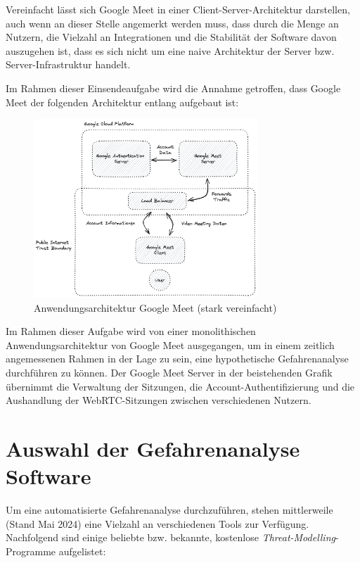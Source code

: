 \documentclass{article}
\begin{document}
Vereinfacht lässt sich Google Meet in einer Client-Server-Architektur darstellen, auch 
wenn an dieser Stelle angemerkt werden muss, dass durch die Menge an Nutzern, die Vielzahl 
an Integrationen und die Stabilität der Software davon auszugehen ist, dass es sich nicht 
um eine naive Architektur der Server bzw. Server-Infrastruktur handelt. 

Im Rahmen dieser Einsendeaufgabe wird die Annahme getroffen, dass Google Meet der 
folgenden Architektur entlang aufgebaut ist:

\begin{figure}[H]
	\includegraphics[width=0.75\textwidth]{./google-meet-diagram.png}
	\centering
	\caption{Anwendungsarchitektur Google Meet (stark vereinfacht)}
\end{figure}

Im Rahmen dieser Aufgabe wird von einer monolithischen Anwendungsarchitektur von Google 
Meet ausgegangen, um in einem zeitlich angemessenen Rahmen in der Lage zu sein, eine 
hypothetische Gefahrenanalyse durchführen zu können. Der Google Meet Server in der 
beistehenden Grafik übernimmt die Verwaltung der Sitzungen, die Account-Authentifizierung 
und die Aushandlung der WebRTC-Sitzungen zwischen verschiedenen Nutzern.

\section{Auswahl der Gefahrenanalyse Software}

Um eine automatisierte Gefahrenanalyse durchzuführen, stehen mittlerweile (Stand Mai 2024) 
eine Vielzahl an verschiedenen Tools zur Verfügung. Nachfolgend sind einige beliebte 
bzw. bekannte, kostenlose \textit{Threat-Modelling}-Programme aufgelistet:
\end{document}
